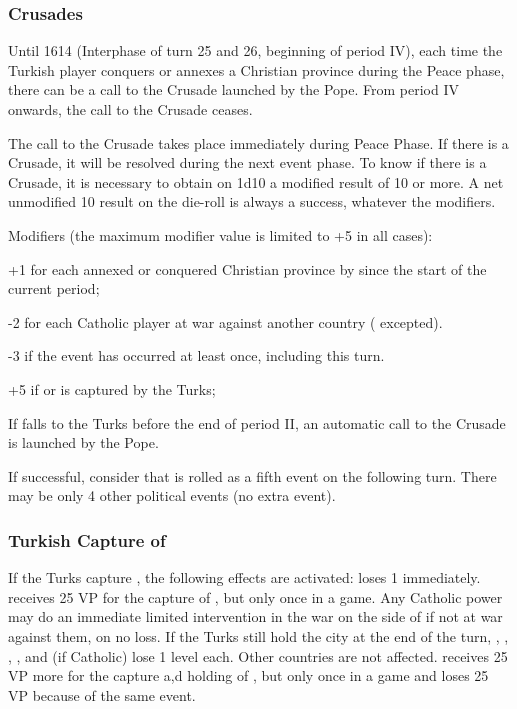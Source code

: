 \label{chSpecific:Crusades and Vienna}


\subsubsection{Crusades}\label{chSpecific:Crusades}
\aparag Until 1614 (Interphase of turn 25 and 26, beginning of period IV),
each time the Turkish player conquers or annexes a Christian province during
the Peace phase, there can be a call to the Crusade launched by the Pope. From
period IV onwards, the call to the Crusade ceases.

The call to the Crusade takes place immediately during Peace Phase. If there
is a Crusade, it will be resolved during the next event phase.
\bparag To know if there is a Crusade, it is necessary to obtain on 1d10 a
modified result of 10 or more.  A net unmodified 10 result on the die-roll is
always a success, whatever the modifiers.

\bparag Modifiers (the maximum modifier value is limited to +5 in all cases):
\begin{modlist}
\item[+1] for each annexed or conquered Christian province by \TUR since the
  start of the current period;
\item[-2] for each Catholic player at war against another country (\TUR
  excepted).
\item[-3] if the event  has occurred at least once,
  including this turn.
\item[+5] if  or  is captured by the Turks;
\end{modlist}
\bparag If  falls to the Turks before the end of period II, an
automatic call to the Crusade is launched by the Pope.

\aparag If successful, consider that  is rolled as a
fifth event on the following turn. There may be only 4 other political events
(no extra event).


\subsubsection{Turkish Capture of }\label{chSpecific:Fall
  Vienna}
\aparag If the Turks capture , the following effects are
activated:
\bparag \HAB loses 1 \STAB immediately. \TUR receives 25 VP for the capture of
, but only once in a game.
\bparag Any Catholic power may do an immediate limited intervention in the war
on the side of \HAB if not at war against them, on no \STAB loss.
\bparag If the Turks still hold the city at the end of the turn, \VEN, \FRA,
\ENG, \SPA, \AUT and \POL (if Catholic) lose 1 \STAB level each.  Other
countries are not affected.  \TUR receives 25 VP more for the capture a,d
holding of , but only once in a game and \HAB loses 25 VP
because of the same event.

